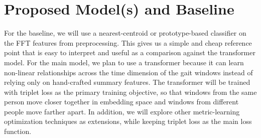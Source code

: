 \section{Proposed Model(s) and Baseline}


For the baseline, we will use a nearest-centroid or prototype-based classifier on the FFT features from preprocessing. This gives us a simple and cheap reference point that is easy to interpret and useful as a comparison against the transformer model. For the main model, we plan to use a transformer because it can learn non-linear relationships across the time dimension of the gait windows instead of relying only on hand-crafted summary features. The transformer will be trained with triplet loss as the primary training objective, so that windows from the same person move closer together in embedding space and windows from different people move farther apart. In addition, we will explore other metric-learning optimization techniques as extensions, while keeping triplet loss as the main loss function.

